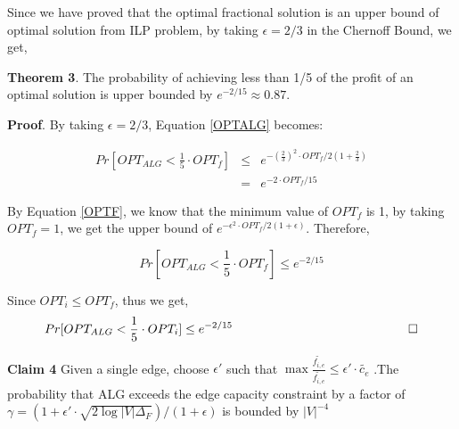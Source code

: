 \documentclass[onecolumn,11pt,journal, compsoc]{IEEEtran}
\newcommand*{\QEDB}{\hfill\ensuremath{\square}}%
\begin{document}
Since we have proved that the optimal fractional solution is an upper bound of optimal solution from ILP problem, by taking $\epsilon = 2/3$ in the Chernoff Bound, we get, 

\textbf{Theorem 3}. The probability of achieving less than 1/5 of the profit of an optimal solution is upper bounded by $e^{-2/15} \approx 0.87$.

\textbf{Proof}.
By taking $\epsilon = 2/3$, Equation \ref{OPTALG} becomes:

\begin{eqnarray}
	Pr[OPT_{ALG}  < \frac{1}{5} \cdot OPT_f] &\le& e^{-(\frac{2}{3})^2 \cdot OPT_f / 2(1+\frac{2}{3})} \\
	&=& e^{-2 \cdot OPT_f/15}
\end{eqnarray}

By Equation \ref{OPTF}, we know that the minimum value of $OPT_f$ is 1, by taking $OPT_f = 1$, we get the upper bound of $e^{-\epsilon^2 \cdot OPT_f / 2(1+\epsilon)}$. Therefore,

\begin{equation}
Pr[OPT_{ALG}  < \frac{1}{5} \cdot OPT_f] \le e^{-2/15}
\end{equation}

Since $OPT_i \le OPT_f$, thus we get, 
\begin{equation}
	Pr[OPT_{ALG}  < \frac{1}{5} \cdot OPT_i] \le e^{-2/15}
	\,\,\,\,\,\,\,\,\,\,\,\,\,\,\,\,\,\,\,\,\,\,\,\,\,\,\,\,\,\,\,\,\,\,\,\,\,\,\,\,\,\,\,\,\,\,\,\,\,\,\,\,\,\,\,\,\,\,\,\,\,\,\,\,\,\,\,\,\,\,\,\,\,\,\,\,\,\,\,\,\,\,\,\,\,\QEDB \nonumber
\end{equation}



%

\vspace*{0.15in}
\textbf{Claim 4} Given a single edge, choose $\epsilon'$ such that $\max \frac{\tilde{f_{i,e}}}{\tilde{f_{i,e}}} \le \epsilon' \cdot \tilde{c_e}$ .The probability that ALG exceeds the edge capacity constraint by a factor of $\gamma = (1+\epsilon' \cdot \sqrt{2\log|V|\Delta_F})/ (1+\epsilon)$ is bounded by $|V|^{-4}$
\vspace*{0.15in}
\end{document}
